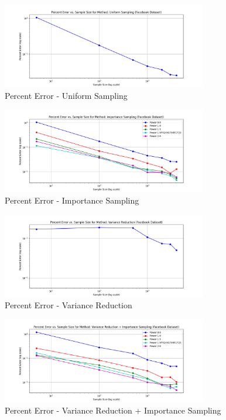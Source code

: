 \documentclass[11pt]{article}
\begin{document}
\begin{figure}[H]
    \centering
    \includegraphics[width=0.8\textwidth]{plots/percent-errors/percent_error_Uniform Sampling.png}
    \caption{Percent Error - Uniform Sampling}
    \label{fig:percent_error_uniform}
\end{figure}

\begin{figure}[H]
    \centering
    \includegraphics[width=0.8\textwidth]{plots/percent-errors/percent_error_Importance Sampling.png}
    \caption{Percent Error - Importance Sampling}
    \label{fig:percent_error_importance}
\end{figure}

\begin{figure}[H]
    \centering
    \includegraphics[width=0.8\textwidth]{plots/percent-errors/percent_error_Variance Reduction.png}
    \caption{Percent Error - Variance Reduction}
    \label{fig:percent_error_variance}
\end{figure}

\begin{figure}[H]
    \centering
    \includegraphics[width=0.8\textwidth]{plots/percent-errors/percent_error_Variance Reduction + Importance Sampling.png}
    \caption{Percent Error - Variance Reduction + Importance Sampling}
    \label{fig:percent_error_variance_importance}
\end{figure}
\end{document}
